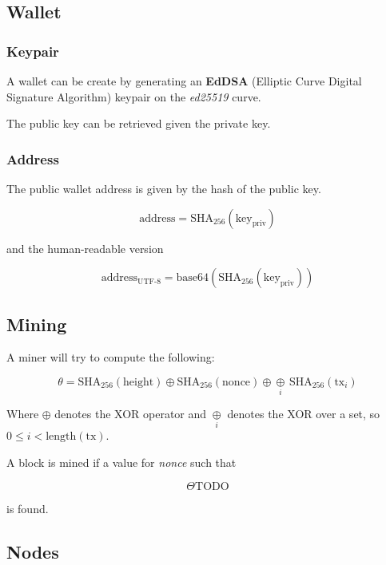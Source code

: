 \documentclass[../documentation.tex]{subfiles}
\begin{document}
\pagebreak

\subsection{Wallet}

\subsubsection{Keypair}

A wallet can be create by generating an \textbf{EdDSA}
(Elliptic Curve Digital Signature Algorithm) keypair
on the \textit{ed25519} curve.

The public key can be retrieved given the private key.

\subsubsection{Address}

The public wallet address is given by the hash of the public key.

\[
    \text{address}=\text{SHA}_{256}(\text{key}_\text{priv})
\]

and the human-readable version

\[
    \text{address}_\text{UTF-8}=\text{base64}(\text{SHA}_{256}(\text{key}_\text{priv}))
\]

\subsection{Mining}

A miner will try to compute the following:

\[
    \theta =
    \text{SHA}_{256}(\text{height})
    \oplus
    \text{SHA}_{256}(\text{nonce})
    \oplus
    \underset{i}{\oplus}\,
    \text{SHA}_{256}(\text{tx}_i)
\]

Where \(\oplus\) denotes the XOR operator and 
\(\underset{i}{\oplus}\) denotes the XOR over a set,
so \(0 \leq i < \text{length}(\text{tx})\).

A block is mined if a value for \textit{nonce} such that

\[
    \Theta \text{TODO}
\]

is found.

\subsection{Nodes}
\end{document}
